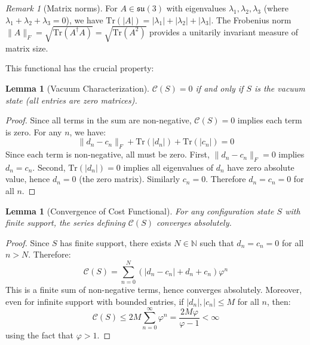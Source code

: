 \documentclass[11pt]{article}
\numberwithin{equation}{section}
\newtheorem{lemma}[theorem]{Lemma}
\theoremstyle{definition}
\theoremstyle{remark}
\newtheorem{remark}[theorem]{Remark}
\begin{document}
\begin{remark}[Matrix norms]
For $A \in \mathfrak{su}(3)$ with eigenvalues $\lambda_1, \lambda_2, \lambda_3$ (where $\lambda_1 + \lambda_2 + \lambda_3 = 0$), we have $\text{Tr}(|A|) = |\lambda_1| + |\lambda_2| + |\lambda_3|$. The Frobenius norm $\|A\|_F = \sqrt{\text{Tr}(A^\dagger A)} = \sqrt{\text{Tr}(A^2)}$ provides a unitarily invariant measure of matrix size.
\end{remark}

This functional has the crucial property:

\begin{lemma}[Vacuum Characterization]
\label{lem:vacuum}
$\mathcal{C}(S) = 0$ if and only if $S$ is the vacuum state (all entries are zero matrices).
\end{lemma}

\begin{proof}
Since all terms in the sum are non-negative, $\mathcal{C}(S) = 0$ implies each term is zero. For any $n$, we have:
\[\|d_n - c_n\|_F + \text{Tr}(|d_n|) + \text{Tr}(|c_n|) = 0\]
Since each term is non-negative, all must be zero. First, $\|d_n - c_n\|_F = 0$ implies $d_n = c_n$. Second, $\text{Tr}(|d_n|) = 0$ implies all eigenvalues of $d_n$ have zero absolute value, hence $d_n = 0$ (the zero matrix). Similarly $c_n = 0$. Therefore $d_n = c_n = 0$ for all $n$.
\end{proof}

\begin{lemma}[Convergence of Cost Functional]
For any configuration state $S$ with finite support, the series defining $\mathcal{C}(S)$ converges absolutely.
\end{lemma}

\begin{proof}
Since $S$ has finite support, there exists $N \in \mathbb{N}$ such that $d_n = c_n = 0$ for all $n > N$. Therefore:
\begin{equation}
\mathcal{C}(S) = \sum_{n=0}^{N} \left(|d_n - c_n| + d_n + c_n\right) \varphi^n
\end{equation}
This is a finite sum of non-negative terms, hence converges absolutely. Moreover, even for infinite support with bounded entries, if $|d_n|, |c_n| \leq M$ for all $n$, then:
\begin{equation}
\mathcal{C}(S) \leq 2M \sum_{n=0}^{\infty} \varphi^n = \frac{2M\varphi}{\varphi - 1} < \infty
\end{equation}
using the fact that $\varphi > 1$.
\end{proof}
\end{document}
